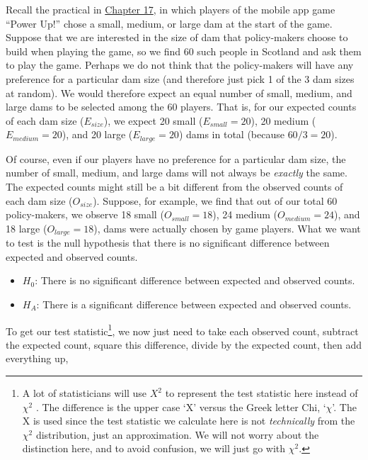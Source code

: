 \documentclass[
]{scrbook}
\providecommand{\tightlist}{%
  \setlength{\itemsep}{0pt}\setlength{\parskip}{0pt}}
\begin{document}
Recall the practical in \protect\hyperlink{Chapter_17}{Chapter 17}, in which players of the mobile app game ``Power Up!'' chose a small, medium, or large dam at the start of the game.
Suppose that we are interested in the size of dam that policy-makers choose to build when playing the game, so we find 60 such people in Scotland and ask them to play the game.
Perhaps we do not think that the policy-makers will have any preference for a particular dam size (and therefore just pick 1 of the 3 dam sizes at random).
We would therefore expect an equal number of small, medium, and large dams to be selected among the 60 players.
That is, for our expected counts of each dam size (\(E_{size}\)), we expect 20 small (\(E_{small} = 20\)), 20 medium (\(E_{medium} = 20\)), and 20 large (\(E_{large} = 20\)) dams in total (because \(60/3 = 20\)).

Of course, even if our players have no preference for a particular dam size, the number of small, medium, and large dams will not always be \emph{exactly} the same.
The expected counts might still be a bit different from the observed counts of each dam size (\(O_{size}\)).
Suppose, for example, we find that out of our total 60 policy-makers, we observe 18 small (\(O_{small} = 18\)), 24 medium (\(O_{medium} = 24\)), and 18 large (\(O_{large} = 18\)), dams were actually chosen by game players.
What we want to test is the null hypothesis that there is no significant difference between expected and observed counts.

\begin{itemize}
\tightlist
\item
  \(H_{0}\): There is no significant difference between expected and observed counts.
\item
  \(H_{A}\): There is a significant difference between expected and observed counts.
\end{itemize}

To get our test statistic\footnote{A lot of statisticians will use \(X^{2}\) to represent the test statistic here instead of \(\chi^{2}\) \citep{Sokal1995}. The difference is the upper case `X' versus the Greek letter Chi, `\(\chi\)'. The X is used since the test statistic we calculate here is not \emph{technically} from the \(\chi^{2}\) distribution, just an approximation. We will not worry about the distinction here, and to avoid confusion, we will just go with \(\chi^{2}\).}, we now just need to take each observed count, subtract the expected count, square this difference, divide by the expected count, then add everything up,
\end{document}
